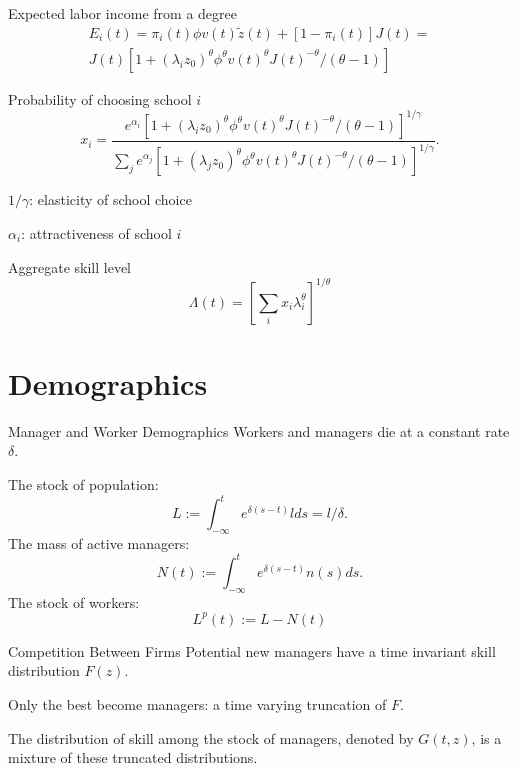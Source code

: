 \documentclass[
  ignorenonframetext,
  aspectratio=1610,
]{beamer}
\let\oldsection\section
\renewcommand{\section}{
  \addtocounter{framenumber}{-1} %
  \oldsection
}
\begin{document}
\begin{frame}{Expected labor income from a degree}
\protect\hypertarget{expected-labor-income-from-a-degree}{}
\begin{multline*}
E_i(t) = 
\pi_i(t)\phi v(t) \tilde z(t) + [1-\pi_i(t)] J(t) = \\
J(t) \left[
1 + (\lambda_i z_0)^\theta \phi^{\theta} v(t)^\theta J(t)^{-\theta}/(\theta-1)
\right]
\end{multline*}
\end{frame}

\begin{frame}{Probability of choosing school \(i\)}
\protect\hypertarget{probability-of-choosing-school-i}{}
\[
x_i = \frac {e^{\alpha_i} \left[
1 + (\lambda_i z_0)^\theta \phi^{\theta} v(t)^\theta J(t)^{-\theta}/(\theta-1)
\right]^{1/\gamma}   } 
{\sum_j e^{\alpha_j}\left[
1 + (\lambda_j z_0)^\theta \phi^{\theta} v(t)^\theta J(t)^{-\theta}/(\theta-1)
\right]^{1/\gamma}   }.
\]

\(1/\gamma\): elasticity of school choice

\(\alpha_i\): attractiveness of school \(i\)
\end{frame}

\begin{frame}{Aggregate skill level}
\protect\hypertarget{aggregate-skill-level}{}
\[
\Lambda(t) = \left[\sum_i x_i \lambda_i^\theta \right]^{1/\theta}
\]
\end{frame}

\section{Demographics}\label{demographics}

\begin{frame}{Manager and Worker Demographics}
\protect\hypertarget{manager-and-worker-demographics}{}
Workers and managers die at a constant rate \(\delta\).

The stock of population: \[
L := \int_{-\infty}^t e^{\delta{(s-t)}}l ds = l/\delta.
\] The mass of active managers: \[
N(t) := \int_{-\infty}^t e^{\delta{(s-t)}}n(s) ds.
\] The stock of workers: \[L^{p} (t) := L-N(t)\]
\end{frame}

\begin{frame}{Competition Between Firms}
\protect\hypertarget{competition-between-firms}{}
Potential new managers have a time invariant skill distribution
\(F(z)\).

Only the best become managers: a time varying truncation of \(F\).

The distribution of skill among the stock of managers, denoted by
\(G(t, z)\), is a mixture of these truncated distributions.
\end{frame}
\end{document}
